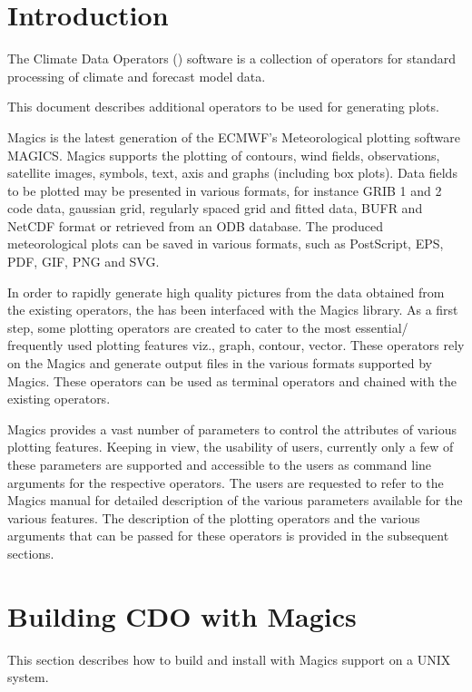 \chapter{Introduction}

The Climate Data Operators ({\CDO}) software is a collection of operators
for standard processing of climate and forecast model data.

This document describes additional {\CDO} operators to be used for generating plots.

Magics is the latest generation of the ECMWF's Meteorological plotting software MAGICS.
Magics supports the plotting of contours, wind fields, observations, satellite images, symbols, text,
axis and graphs (including box plots). Data fields to be plotted may be presented in various formats, for
instance GRIB 1 and 2 code data, gaussian grid, regularly spaced grid and fitted data, BUFR and
NetCDF format or retrieved from an ODB database. The produced meteorological plots can be saved in
various formats, such as PostScript, EPS, PDF, GIF, PNG and SVG. \cite{Magics}

In order to rapidly generate high quality pictures from the data obtained from the existing {\CDO}
operators, the {\CDO} has been interfaced with the Magics library. As a first step, some {\CDO} plotting
operators are created to cater to the most essential/ frequently used plotting features viz., graph,
contour, vector. These operators rely on the Magics and generate output files in the various formats
supported by Magics. These operators can be used as terminal operators and chained with the existing 
operators.

Magics provides a vast number of parameters to control the attributes of various plotting
features. Keeping in view, the usability of {\CDO} users, currently only a few of these parameters are
supported and accessible to the {\CDO} users as command line arguments for the respective operators.
The users are requested to refer to the Magics manual \cite{Magics} for detailed description of the various
parameters available for the various features. The description of the plotting operators and the
various arguments that can be passed for these operators is provided in the subsequent sections.

\chapter{Building CDO with Magics}

This section describes how to build and install {\CDO} with Magics
support on a UNIX system.

